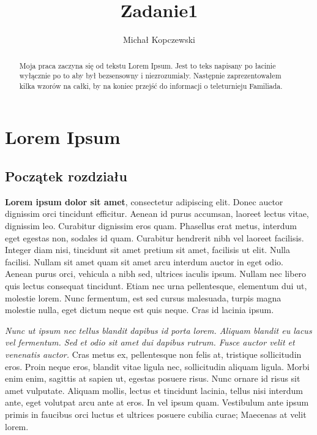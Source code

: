 \documentclass{article}
\title{Zadanie1}
\author{Michał Kopczewski}
\begin{document}
\maketitle

\newpage

\begin{abstract}
    Moja praca zaczyna się od tekstu Lorem Ipsum. Jest to teks napisany po łacinie wyłącznie po to aby był bezsensowny i niezrozumiały. 
Następnie zaprezentowałem kilka wzorów na całki, by na koniec przejść do informacji o teleturnieju Familiada.
\end{abstract}

\tableofcontents

\newpage

\section{Lorem Ipsum}
\subsection{Początek rozdziału}
\textbf{Lorem ipsum dolor sit amet}, consectetur adipiscing elit. Donec auctor dignissim orci tincidunt efficitur. Aenean id purus 
accumsan, laoreet lectus vitae, dignissim leo. Curabitur dignissim eros quam. Phasellus erat metus, interdum eget egestas non, sodales 
id quam. Curabitur hendrerit nibh vel laoreet facilisis. Integer diam nisi, tincidunt sit amet pretium sit amet, facilisis ut elit. 
Nulla facilisi. Nullam sit amet quam sit amet arcu interdum auctor in eget odio. Aenean purus orci, vehicula a nibh sed, ultrices 
iaculis ipsum. Nullam nec libero quis lectus consequat tincidunt. Etiam nec urna pellentesque, elementum dui ut, molestie lorem. Nunc 
fermentum, est sed cursus malesuada, turpis magna molestie nulla, eget dictum neque est quis neque. Cras id lacinia ipsum.

\textit{Nunc ut ipsum nec tellus blandit dapibus id porta lorem. Aliquam blandit eu lacus vel fermentum. Sed et odio sit amet dui 
dapibus rutrum. Fusce auctor velit et venenatis auctor.} Cras metus ex, pellentesque non felis at, tristique sollicitudin eros. Proin 
neque eros, blandit vitae ligula nec, sollicitudin aliquam ligula. Morbi enim enim, sagittis at sapien ut, egestas posuere risus. Nunc 
ornare id risus sit amet vulputate. Aliquam mollis, lectus et tincidunt lacinia, tellus nisi interdum ante, eget volutpat arcu ante at 
eros. In vel ipsum quam. Vestibulum ante ipsum primis in faucibus orci luctus et ultrices posuere cubilia curae; Maecenas at velit 
lorem.
\end{document}
